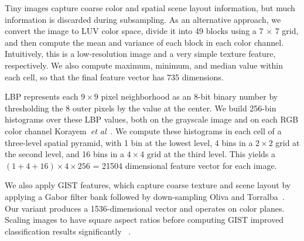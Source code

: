  Tiny images capture coarse color and spatial
scene layout information, but much information is discarded during
subsampling.  As an alternative approach, we convert the image to LUV
color space, divide it into 49 blocks using a 7 $\times$ 7 grid, and
then compute the mean and variance of each block in each color
channel.  Intuitively, this is a low-resolution image and a very
simple texture feature, respectively.  We also compute maximum,
minimum, and median value within each cell, so that the final
feature vector has 735 dimensions.




 LBP represents each $9 \times 9$ pixel neighborhood 
as an 8-bit binary number by thresholding the 8 outer pixels
by the value at the center.  We build 256-bin histograms over
these LBP values, both on the grayscale image and on each RGB color
channel Korayem~\textit{et al}~\cite{korayem2012solving}. We compute these histograms in each cell of a three-level spatial
pyramid, with 1 bin at the lowest level, 4 bins in a $2 \times 2$ grid
at the second level, and 16 bins in a $4 \times 4$ grid at the third level.
This yields a $(1+4+16) \times 4 \times 256$ = 21504 dimensional feature
vector for each image.

 We also apply GIST features, which capture coarse texture
and scene layout by applying a Gabor filter bank followed by
down-sampling Oliva and Torralba~\cite{oliva2001modeling}. Our variant produces a
1536-dimensional  vector and operates on color planes. Scaling
images to have square aspect ratios before computing GIST improved
classification results significantly ~\cite{douze2009evaluation}.



